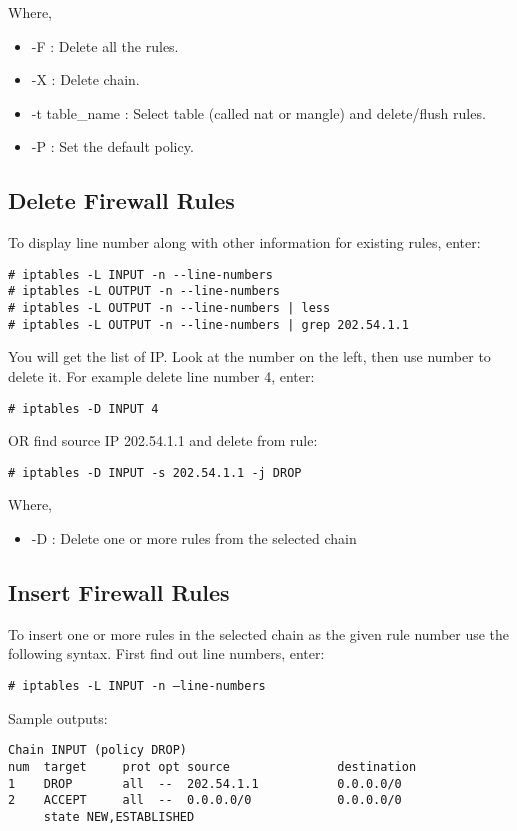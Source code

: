 Where,
\begin{itemize}
\item -F : Delete all the rules.
\item -X : Delete chain.
\item -t table\_name : Select table (called nat or mangle) 
and delete/flush rules.
\item -P : Set the default policy.
\end{itemize}

\subsection{Delete Firewall Rules}

To display line number along with other information for existing rules, enter:
\begin{verbatim}
# iptables -L INPUT -n --line-numbers
# iptables -L OUTPUT -n --line-numbers
# iptables -L OUTPUT -n --line-numbers | less
# iptables -L OUTPUT -n --line-numbers | grep 202.54.1.1
\end{verbatim}

You will get the list of IP. Look at the number on the left, then use 
number to delete it. For example delete line number 4, enter:
\begin{verbatim}
# iptables -D INPUT 4
\end{verbatim}

OR find source IP 202.54.1.1 and delete from rule:
\begin{verbatim}
# iptables -D INPUT -s 202.54.1.1 -j DROP
\end{verbatim}
Where,
\begin{itemize}
\item -D : Delete one or more rules from the selected chain
\end{itemize}

\subsection{Insert Firewall Rules}

To insert one or more rules in the selected chain as the given rule 
number use the following syntax. First find out line numbers, enter:
\begin{verbatim}
# iptables -L INPUT -n –line-numbers
\end{verbatim}

Sample outputs:
\begin{verbatim}
Chain INPUT (policy DROP)
num  target     prot opt source               destination
1    DROP       all  --  202.54.1.1           0.0.0.0/0
2    ACCEPT     all  --  0.0.0.0/0            0.0.0.0/0      
     state NEW,ESTABLISHED
\end{verbatim}

